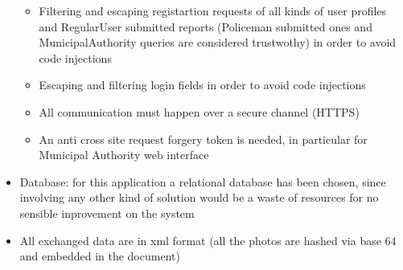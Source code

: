 \begin{itemize}
	\begin{itemize}
		\item Filtering and escaping registartion requests of all kinds of user profiles and RegularUser submitted reports (Policeman submitted ones and MunicipalAuthority queries are considered trustwothy) in order to avoid code injections
		\item Escaping and filtering login fields in order to avoid code injections
		\item All communication must happen over a secure channel (HTTPS)
		\item An anti cross site request forgery token is needed, in particular for Municipal Authority web interface
	\end{itemize}
	\item Database: for this application a relational database has been chosen, since involving any other kind of solution would be a waste of resources for no sensible inprovement on the system
	\item All exchanged data are in xml format (all the photos are hashed via base 64 and embedded in the document)
\end{itemize}